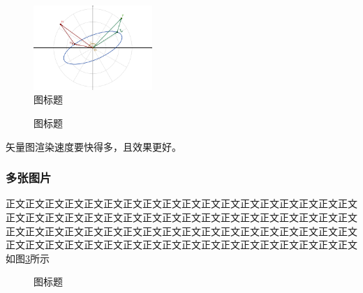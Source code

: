 \documentclass[a4paper]{article}
\begin{document}
\begin{figure}[!h]
	\centering
	\vspace{0cm}
	\includegraphics[width=0.4\textwidth,trim=0 0 0 0,clip]{figures/fig6.pdf}%
	\vspace{0cm}
	\caption{图标题}
	\label{fig:pdf}
\end{figure}

\begin{figure}[!h]
	\centering
	\vspace{0cm}
	
	\vspace{0cm}
	\caption{图标题}
	\label{fig:svg}
\end{figure}

矢量图渲染速度要快得多，且效果更好。

\subsubsection{多张图片}
正文正文正文正文正文正文正文正文正文正文正文正文正文正文正文正文正文正文正文正文正文正文正文正文正文正文正文正文正文正文正文正文正文正文正文正文正文正文正文正文正文正文正文正文正文正文正文正文正文正文正文正文正文\cite{wiki,EM}正文正文正文正文正文正文正文正文正文正文正文正文正文正文正文正文正文正文正文如图\ref{fig:multi}所示

\begin{figure}[!h]
	\centering
	\caption{图标题}
	\label{fig:multi}
\end{figure}
\end{document}

